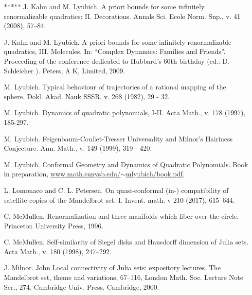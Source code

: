 \begin{thebibliography}{*****}
   J. Kahn and M. Lyubich. A priori bounds for some infinitely renormalizable quadratics: \RN{2}. Decorations. Annals Sci. Ecole Norm. Sup., v. 41 (2008), 57--84.
 
    J. Kahn and M. Lyubich. A priori bounds for some infinitely renormalizable quadratics, \RN{3}. Molecules. In: ``Complex Dynamics: Families and Friends''.  Proceeding of the conference dedicated to Hubbard's 60th birthday 
(ed.: D. Schleicher ). Peters, A K, Limited, 2009. 



 M. Lyubich. Typical behaviour of trajectories of a rational mapping of the sphere. Dokl. Akad. Nauk SSSR, v. 268 (1982), 29 - 32.


 M. Lyubich. Dynamics of quadratic polynomials, \RN{1}-\RN{2}. 
Acta Math., v. 178 (1997), 185-297.

 M. Lyubich. Feigenbaum-Coullet-Tresser Universality and Milnor's Hairiness Conjecture.
   Ann. Math., v. 149 (1999), 319 - 420.

 M. Lyubich. Conformal Geometry and Dynamics of
  Quadratic Polynomials. Book in preparation, \href{http://www.math.stonybrook.edu/~mlyubich/book.pdf}{www.math.sunysb.edu/$\sim$mlyubich/book.pdf}.



 L. Lomonaco and C. L. Petersen. On quasi-conformal (in-) compatibility of satellite copies of the Mandelbrot set: \RN{1}. Invent. math. v 210 (2017), 615--644.

 C. McMullen. Renormalization and three manifolds
  which fiber over the circle.   Princeton University Press, 1996. 

 C. McMullen. Self-similarity of Siegel disks and Hausdorff dimension of Julia sets.
  Acta Math., v. 180 (1998), 247--292.  


 J. Milnor. John Local connectivity of Julia sets: expository lectures. The Mandelbrot set, theme and variations, 67--116, London Math. Soc. Lecture Note Ser., 274, Cambridge Univ. Press, Cambridge, 2000.






\end{thebibliography}
